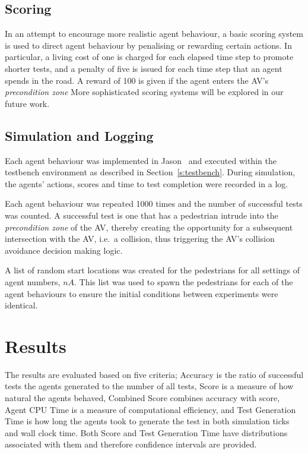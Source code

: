 \documentclass[letterpaper, 10 pt, journal, twoside]{IEEEtran}
\begin{document}
\subsection{Scoring}

In an attempt to encourage more realistic agent behaviour, a basic scoring system is used to direct agent behaviour by penalising or rewarding certain actions. In particular, a living cost of one is charged for each elapsed time step to promote shorter tests, and a penalty of five is issued for each time step that  an agent spends in the road. A reward of 100 is given if the agent enters the AV's \textit{precondition zone} More sophisticated scoring systems will be explored in our future work. 




\subsection{Simulation and Logging}

Each agent behaviour was implemented in Jason~\cite{bordini2005jason} and executed within the testbench environment as described in Section~\ref{s:testbench}.
%
During simulation, the agents' actions, scores and time to test completion were recorded in a log.

Each agent behaviour was repeated 1000 times and the number of successful tests was counted. A successful test is one that has a pedestrian intrude into the \textit{precondition zone} of the AV, thereby creating the opportunity for a subsequent intersection with the AV, i.e.\ a collision, thus triggering the AV's collision avoidance decision making logic.

%
A list of random start locations was created for the pedestrians for all settings of agent numbers, $nA$. This list was used to spawn the pedestrians for each of the agent behaviours to ensure the initial conditions between experiments were identical. 

\section{Results}\label{s:results}
The results are evaluated based on five criteria; Accuracy is the ratio of successful tests the agents generated to the number of all tests, Score is a measure of how natural the agents behaved, Combined Score combines accuracy with score, Agent CPU Time is a measure of computational efficiency, and Test Generation Time is how long the agents took to generate the test in both simulation ticks and wall clock time. Both Score and Test Generation Time have distributions associated with them and therefore confidence intervals are provided.
\end{document}
